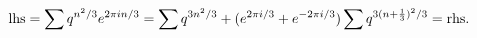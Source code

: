 \begin{equation*}
  {\rm lhs} = \sum q^{n^2 /3} e^{2\pi in/3} 
= \sum q^{3n^2 /3} + (e^{2\pi i/3} + e^{-2\pi i/3})
  \sum q^{3(n+{1\over 3})^2 /3} =  {\rm rhs}.
\end{equation*}

